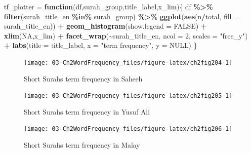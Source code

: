 \documentclass[
]{article}
\newenvironment{Shaded}{\begin{snugshade}}{\end{snugshade}}
\newcommand{\AttributeTok}[1]{\textcolor[rgb]{0.13,0.29,0.53}{#1}}
\newcommand{\ConstantTok}[1]{\textcolor[rgb]{0.56,0.35,0.01}{#1}}
\newcommand{\ControlFlowTok}[1]{\textcolor[rgb]{0.13,0.29,0.53}{\textbf{#1}}}
\newcommand{\DecValTok}[1]{\textcolor[rgb]{0.00,0.00,0.81}{#1}}
\newcommand{\FunctionTok}[1]{\textcolor[rgb]{0.13,0.29,0.53}{\textbf{#1}}}
\newcommand{\NormalTok}[1]{#1}
\newcommand{\OtherTok}[1]{\textcolor[rgb]{0.56,0.35,0.01}{#1}}
\newcommand{\SpecialCharTok}[1]{\textcolor[rgb]{0.81,0.36,0.00}{\textbf{#1}}}
\newcommand{\StringTok}[1]{\textcolor[rgb]{0.31,0.60,0.02}{#1}}
\begin{document}
\begin{Shaded}
\begin{Highlighting}[]
\NormalTok{tf\_plotter }\OtherTok{=} \ControlFlowTok{function}\NormalTok{(df,surah\_group,title\_label,x\_lim)\{}
\NormalTok{  df }\SpecialCharTok{\%\textgreater{}\%} 
  \FunctionTok{filter}\NormalTok{(surah\_title\_en }\SpecialCharTok{\%in\%}\NormalTok{ surah\_group) }\SpecialCharTok{\%\textgreater{}\%}
  \FunctionTok{ggplot}\NormalTok{(}\FunctionTok{aes}\NormalTok{(n}\SpecialCharTok{/}\NormalTok{total, }\AttributeTok{fill =}\NormalTok{ surah\_title\_en)) }\SpecialCharTok{+}
  \FunctionTok{geom\_histogram}\NormalTok{(}\AttributeTok{show.legend =} \ConstantTok{FALSE}\NormalTok{) }\SpecialCharTok{+}
  \FunctionTok{xlim}\NormalTok{(}\ConstantTok{NA}\NormalTok{,x\_lim) }\SpecialCharTok{+}
  \FunctionTok{facet\_wrap}\NormalTok{(}\SpecialCharTok{\textasciitilde{}}\NormalTok{surah\_title\_en, }\AttributeTok{ncol =} \DecValTok{2}\NormalTok{, }\AttributeTok{scales =} \StringTok{"free\_y"}\NormalTok{) }\SpecialCharTok{+}
  \FunctionTok{labs}\NormalTok{(}\AttributeTok{title =}\NormalTok{ title\_label,}
       \AttributeTok{x =} \StringTok{"term frequency"}\NormalTok{,}
       \AttributeTok{y =} \ConstantTok{NULL}\NormalTok{)}
\NormalTok{\}}
\end{Highlighting}
\end{Shaded}

\begin{figure}

{\centering \texttt{[image: 03-Ch2WordFrequency\_files/figure-latex/ch2fig204-1]} 

}

\caption{Short Surahs term frequency in Saheeh}\label{fig:ch2fig204}
\end{figure}

\begin{figure}

{\centering \texttt{[image: 03-Ch2WordFrequency\_files/figure-latex/ch2fig205-1]} 

}

\caption{Short Surahs term frequency in Yusuf Ali}\label{fig:ch2fig205}
\end{figure}

\begin{figure}

{\centering \texttt{[image: 03-Ch2WordFrequency\_files/figure-latex/ch2fig206-1]} 

}

\caption{Short Surahs term frequency in Malay}\label{fig:ch2fig206}
\end{figure}
\end{document}
